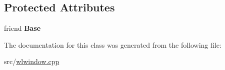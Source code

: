 \subsection*{Protected Attributes}
\begin{DoxyCompactItemize}
\item 
\mbox{\label{classwlwin_1_1Seat_abdc96ea29c4b9c02f6a12bec8e9e9c25}} 
friend {\bfseries Base}
\end{DoxyCompactItemize}


The documentation for this class was generated from the following file\+:\begin{DoxyCompactItemize}
\item 
src/\mbox{\hyperlink{wlwindow_8cpp}{wlwindow.\+cpp}}\end{DoxyCompactItemize}
